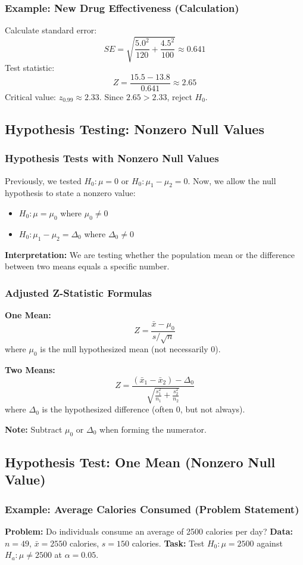 \documentclass[handout]{beamer}
\begin{document}
\begin{frame}
\frametitle{Example: New Drug Effectiveness (Calculation)}
Calculate standard error:
\[ SE = \sqrt{\frac{5.0^2}{120} + \frac{4.5^2}{100}} \approx 0.641 \]
Test statistic:
\[ Z = \frac{15.5-13.8}{0.641} \approx 2.65 \]
Critical value: $z_{0.99} \approx 2.33$.
Since $2.65 > 2.33$, reject $H_0$.
\end{frame}

\subsection{Hypothesis Testing: Nonzero Null Values}

\begin{frame}
\frametitle{Hypothesis Tests with Nonzero Null Values}
Previously, we tested $H_0: \mu = 0$ or $H_0: \mu_1 - \mu_2 = 0$.\newline
Now, we allow the null hypothesis to state a nonzero value:
\begin{itemize}
\item $H_0: \mu = \mu_0$ where $\mu_0 \neq 0$
\item $H_0: \mu_1 - \mu_2 = \Delta_0$ where $\Delta_0 \neq 0$
\end{itemize}
\textbf{Interpretation:} We are testing whether the population mean or the difference between two means equals a specific number.
\end{frame}

\begin{frame}
\frametitle{Adjusted Z-Statistic Formulas}
\textbf{One Mean:}
\[
Z = \frac{\bar{x} - \mu_0}{s / \sqrt{n}}
\]
where $\mu_0$ is the null hypothesized mean (not necessarily 0).\newline

\textbf{Two Means:}
\[
Z = \frac{(\bar{x}_1 - \bar{x}_2) - \Delta_0}{\sqrt{\frac{s_1^2}{n_1} + \frac{s_2^2}{n_2}}}
\]
where $\Delta_0$ is the hypothesized difference (often 0, but not always).\newline

\textbf{Note:} Subtract $\mu_0$ or $\Delta_0$ when forming the numerator.
\end{frame}

\subsection{Hypothesis Test: One Mean (Nonzero Null Value)}

\begin{frame}
\frametitle{Example: Average Calories Consumed (Problem Statement)}
\textbf{Problem:} Do individuals consume an average of 2500 calories per day? \newline
\textbf{Data:} $n=49$, $\bar{x}=2550$ calories, $s=150$ calories. \newline
\textbf{Task:} Test $H_0: \mu = 2500$ against $H_a: \mu \neq 2500$ at $\alpha=0.05$.
\end{frame}
\end{document}

